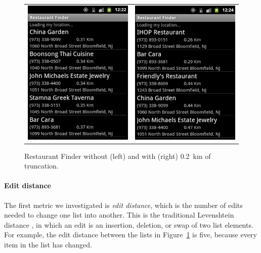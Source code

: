 \documentclass[10pt, conference, compsocconf]{IEEEtran}
\begin{document}
{\begin{figure}
  \centering
  \begin{tabular}{cc}
    \includegraphics[width=.4\columnwidth]{restaurant_finder_ref_screenshot}
    & 
    \includegraphics[width=.4\columnwidth]{restaurant_finder_nominal_screenshot}
  \end{tabular}
  \caption{Restaurant Finder without (left) and with (right)
    0.2~km of truncation.}
  \label{fig:app-example}
\end{figure}

\paragraph*{Edit distance}

The first metric we investigated is \emph{edit distance}, which is the
number of edits needed to change one list into another. This is the
traditional Levenshtein distance \cite{levenshtein:1966}, in which an
edit is an insertion, deletion, or swap of two list elements. For
example, the edit distance between the lists in
Figure~\ref{fig:app-example} is five, because every item in the
list has changed.

}
\end{document}
